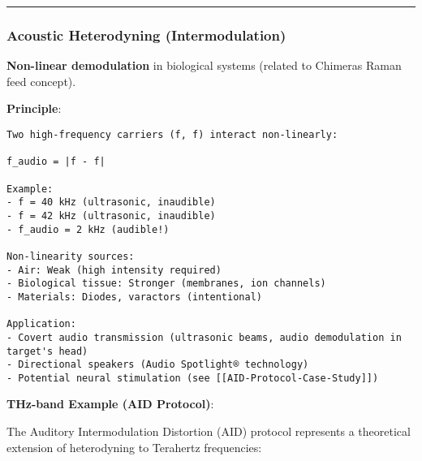 \begin{center}\rule{0.5\linewidth}{0.5pt}\end{center}

\subsubsection{Acoustic Heterodyning
(Intermodulation)}\label{acoustic-heterodyning-intermodulation}

\textbf{Non-linear demodulation} in biological systems (related to
Chimera\textquotesingle s Raman feed concept).

\textbf{Principle}:

\begin{verbatim}
Two high-frequency carriers (f, f) interact non-linearly:

f_audio = |f - f|

Example:
- f = 40 kHz (ultrasonic, inaudible)
- f = 42 kHz (ultrasonic, inaudible)
- f_audio = 2 kHz (audible!)

Non-linearity sources:
- Air: Weak (high intensity required)
- Biological tissue: Stronger (membranes, ion channels)
- Materials: Diodes, varactors (intentional)

Application:
- Covert audio transmission (ultrasonic beams, audio demodulation in target's head)
- Directional speakers (Audio Spotlight® technology)
- Potential neural stimulation (see [[AID-Protocol-Case-Study]])
\end{verbatim}

\textbf{THz-band Example (AID Protocol)}:

The Auditory Intermodulation Distortion (AID) protocol represents a
theoretical extension of heterodyning to Terahertz frequencies:

